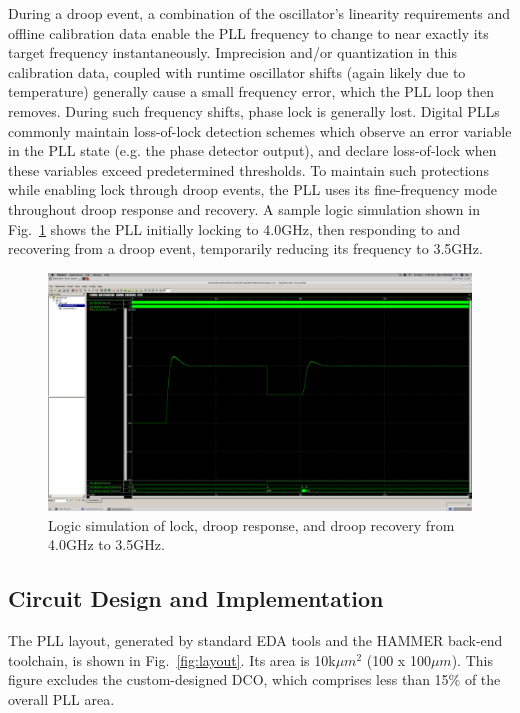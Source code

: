\documentclass[twoside,9pt,journal,letterpage]{IEEEtran}
\begin{document}
During a droop event, a combination of the oscillator's linearity requirements and offline calibration data enable the PLL frequency to change to near exactly its target frequency instantaneously. Imprecision and/or quantization in this calibration data, coupled with runtime oscillator shifts (again likely due to temperature) generally cause a small frequency error, which the PLL loop then removes. During such frequency shifts, phase lock is generally lost. Digital PLLs commonly maintain loss-of-lock detection schemes which observe an error variable in the PLL state (e.g. the phase detector output), and declare loss-of-lock when these variables exceed predetermined thresholds. To maintain such protections while enabling lock through droop events, the PLL uses its fine-frequency mode throughout droop response and recovery. A sample logic simulation shown in Fig.\ \ref{fig:brake} shows the PLL initially locking to 4.0GHz, then responding to and recovering from a droop event, temporarily reducing its frequency to 3.5GHz. 

\begin{figure}[h]
	\centering
	\includegraphics[width=0.7\columnwidth]{brake1.png}
	\caption{Logic simulation of lock, droop response, and droop recovery from 4.0GHz to 3.5GHz.}
	\label{fig:brake}
\end{figure}

\vspace{-7pt}
\subsection{Circuit Design and Implementation}

The PLL layout, generated by standard EDA tools and the HAMMER \cite{wanghammer} back-end toolchain, is shown in Fig.\ \ref{fig:layout}. Its area is 10k$\mu m^2$ (100 x 100$\mu m$). This figure excludes the custom-designed DCO, which comprises less than 15\% of the overall PLL area. 
\end{document}
